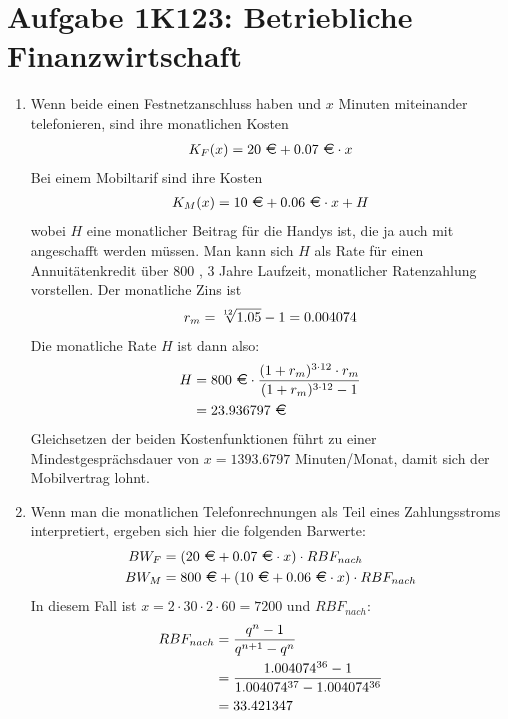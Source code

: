\documentclass{article}
\begin{document}
	\section*{Aufgabe 1K123: Betriebliche Finanzwirtschaft}
	\begin{enumerate}[label=(\alph*)]
		\item Wenn beide einen Festnetzanschluss haben und $x$ Minuten miteinander telefonieren, sind ihre monatlichen Kosten
		\begin{align}
			K_F(x) = 20\text{ \EUR}+0.07\text{ \EUR}\cdot x \notag
		\end{align}
		Bei einem Mobiltarif sind ihre Kosten
		\begin{align}
			K_M(x) = 10\text{ \EUR}+0.06\text{ \EUR} \cdot x + H \notag
		\end{align}
		wobei $H$ eine monatlicher Beitrag für die Handys ist, die ja auch mit angeschafft werden müssen. Man kann sich $H$ als Rate für einen Annuitätenkredit über 800 \EUR, 3 Jahre Laufzeit, monatlicher Ratenzahlung vorstellen. Der monatliche Zins ist
		\begin{align}
			r_m = \sqrt[12]{1.05}-1 = 0.004074 \notag
		\end{align}
		Die monatliche Rate $H$ ist dann also:
		\begin{align}
			H &= 800\text{ \EUR}\cdot \frac{(1+r_m)^{3\cdot 12}\cdot r_m}{(1+r_m)^{3\cdot 12}-1} \notag \\
			&= 23.936797 \text{ \EUR} \notag
		\end{align}
		Gleichsetzen der beiden Kostenfunktionen führt zu einer Mindestgesprächsdauer von $x=1393.6797$ Minuten/Monat, damit sich der Mobilvertrag lohnt.
		\item Wenn man die monatlichen Telefonrechnungen als Teil eines Zahlungsstroms interpretiert, ergeben sich hier die folgenden Barwerte:
		\begin{align}
			BW_F &= (20\text{ \EUR}+0.07\text{ \EUR}\cdot x)\cdot RBF_{nach} \notag \\
			BW_M &= 800\text{ \EUR}+(10\text{ \EUR}+0.06\text{ \EUR} \cdot x)\cdot RBF_{nach} \notag
		\end{align}
		In diesem Fall ist $x=2\cdot 30\cdot 2\cdot 60=7200$ und $RBF_{nach}$:
		\begin{align}
			RBF_{nach} &= \frac{q^n-1}{q^{n+1}-q^n} \notag \\
			&= \frac{1.004074^{36}-1}{1.004074^{37}-1.004074^{36}} \notag \\
			&= 33.421347 \notag
		\end{align}

\end{enumerate}
\end{document}
